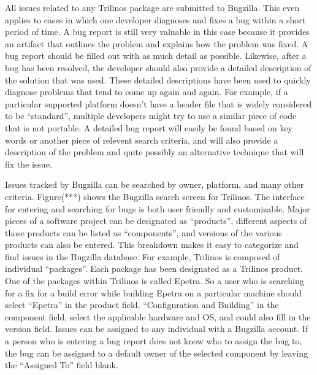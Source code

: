 \documentclass[12pt,relax]{article}
\begin{document}
All issues related to any Trilinos package are submitted to Bugzilla.  This 
even applies to cases in which 
one developer diagnoses and fixes a bug within a short period of time.  A bug 
report is still very valuable in this case because it provides an artifact 
that outlines the problem and explains how the problem was fixed.  A bug 
report should be filled out with as much detail as possible.  Likewise, after 
a bug has been resolved, the developer should also provide a detailed 
description of the solution that was used.  These detailed descriptions have 
been used to quickly diagnose problems that tend to come up again and again.
For example, if a particular supported platform doesn't have a header file 
that is widely considered to be ``standard'', multiple developers might try 
to use a similar piece of code that is not portable.  A detailed bug report 
will easily be found based on key words or another piece of relevent search 
criteria, and will also provide a description of the problem and quite 
possibly an alternative technique that will fix the issue. 

Issues tracked by Bugzilla can be searched by owner, platform, and many other 
criteria.  Figure(***) shows the Bugzilla search screen for Trilinos.  The 
interface for entering and searching for bugs is both user friendly and 
customizable.  Major pieces of a software project can be 
designated as ``products'', different aspects of those products can be 
listed as ``components'', and versions of the various products can also be 
entered.  This breakdown makes it easy to categorize and find issues in the 
Bugzilla database.  For example, Trilinos is composed of individual 
``packages''.  Each package has been designated as a Trilinos product.  One of 
the packages within Trilinos is called Epetra.  So a user who is searching for 
a fix for a build error while building Epetra on a particular 
machine should select ``Epetra'' in the product field, ``Configuration and 
Building'' in the component field, select the applicable hardware and OS, and
could also fill in the version field.  Issues can be assigned to any 
individual with a Bugzilla account.  If a 
person who is entering a bug report does not know who to assign the bug to,
the bug can be assigned to a default owner of the selected component 
by leaving the ``Assigned To'' field blank.  

\end{document}
